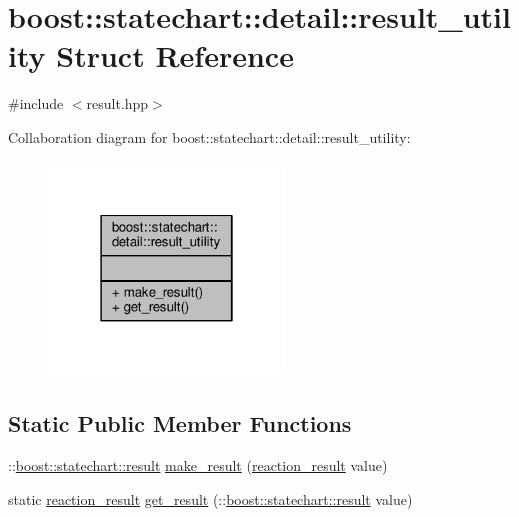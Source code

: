 \hypertarget{structboost_1_1statechart_1_1detail_1_1result__utility}{}\section{boost\+:\+:statechart\+:\+:detail\+:\+:result\+\_\+utility Struct Reference}
\label{structboost_1_1statechart_1_1detail_1_1result__utility}


{\ttfamily \#include $<$result.\+hpp$>$}



Collaboration diagram for boost\+:\+:statechart\+:\+:detail\+:\+:result\+\_\+utility\+:
\nopagebreak
\begin{figure}[H]
\begin{center}
\leavevmode
\includegraphics[width=178pt]{structboost_1_1statechart_1_1detail_1_1result__utility__coll__graph}
\end{center}
\end{figure}
\subsection*{Static Public Member Functions}
\begin{DoxyCompactItemize}
\item 
\+::\mbox{\hyperlink{namespaceboost_1_1statechart_abe807f6598b614d6d87bb951ecd92331}{boost\+::statechart\+::result}} \mbox{\hyperlink{structboost_1_1statechart_1_1detail_1_1result__utility_a5fa50ca644cdbc3c841f2111130cd3df}{make\+\_\+result}} (\mbox{\hyperlink{namespaceboost_1_1statechart_1_1detail_ab091bbb4c29327fb46ee479ea1b7255b}{reaction\+\_\+result}} value)
\item 
static \mbox{\hyperlink{namespaceboost_1_1statechart_1_1detail_ab091bbb4c29327fb46ee479ea1b7255b}{reaction\+\_\+result}} \mbox{\hyperlink{structboost_1_1statechart_1_1detail_1_1result__utility_ab782ed3d4fb9a27313f8f431d8bde936}{get\+\_\+result}} (\+::\mbox{\hyperlink{namespaceboost_1_1statechart_abe807f6598b614d6d87bb951ecd92331}{boost\+::statechart\+::result}} value)
\end{DoxyCompactItemize}


